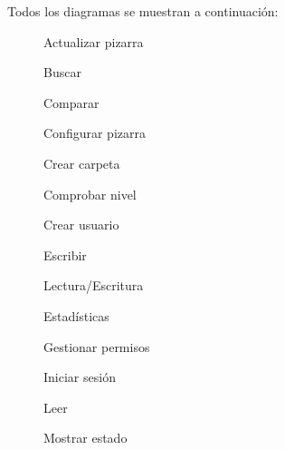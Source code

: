 Todos los diagramas se muestran a continuación: 

\vspace*{3cm}
\begin{figure}[!h]
\centering
\actualizarPizarra
\caption{Actualizar pizarra}
\end{figure}
\newpage

\begin{figure}[!h]
\centering
\buscar
\caption{Buscar}
\end{figure}
\newpage

\begin{figure}[!h]
\centering
\comparar
\caption{Comparar}
\end{figure}
\newpage

\begin{figure}[!h]
\centering
\configurarPizarra
\caption{Configurar pizarra}
\end{figure}
\newpage

\begin{figure}[!h]
\centering
\crearCarpeta
\caption{Crear carpeta}
\end{figure}
\newpage

\begin{figure}[!h]
\centering
\comprobarNivel
\caption{Comprobar nivel}
\end{figure}
\newpage

\begin{figure}[!h]
\centering
\crearUsuario
\caption{Crear usuario}
\end{figure}
\newpage

\begin{figure}[!h]
\centering
\escribir
\caption{Escribir}
\end{figure}
\newpage

\begin{figure}[!h]
\centering
\lecturaEscritura
\caption{Lectura/Escritura}
\end{figure}
\newpage

\begin{figure}[!h]
\centering
\estadisticas
\caption{Estadísticas}
\end{figure}
\newpage

\begin{figure}[!h]
\centering
\gestionarPermisos
\caption{Gestionar permisos}
\end{figure}
\newpage

\begin{figure}[!h]
\centering
\iniciarSesion
\caption{Iniciar sesión}
\end{figure}
\newpage

\begin{figure}[!h]
\centering
\leer
\caption{Leer}
\end{figure}
\newpage

\begin{figure}[!h]
\centering
\mostrarEstado
\caption{Mostrar estado}
\end{figure}
\newpage

